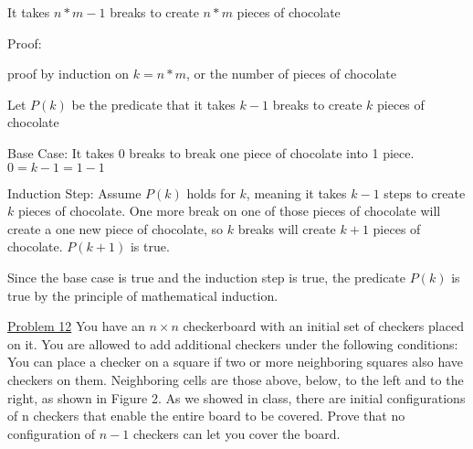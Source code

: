 \documentclass[12pt]{article}[12pt]
\begin{document}
\begin{addmargin}[1em]{2em}

It takes $n*m-1$ breaks to create $n*m$ pieces of chocolate

Proof: 

proof by induction on $k=n*m$, or the number of pieces of chocolate

Let $P(k)$ be the predicate that it takes $k-1$ breaks to create $k$ pieces of chocolate

Base Case: It takes 0 breaks to break one piece of chocolate into 1 piece. $0=k-1=1-1$

Induction Step: Assume $P(k)$ holds for $k$, meaning it takes $k-1$ steps to create $k$ pieces of chocolate. One more break on one of those pieces of chocolate will create a one new piece of chocolate, so $k$ breaks will create $k+1$ pieces of chocolate. $P(k+1)$ is true.

Since the base case is true and the induction step is true, the predicate $P(k)$ is true by the principle of mathematical induction.
\end{addmargin}
\bigskip
\underline{Problem 12}
You have an $n×n$ checkerboard with an initial set of checkers placed on it. You are allowed to add additional checkers under the following conditions: You can place a checker on a square if two or more neighboring squares also have checkers on them. Neighboring cells are those above, below, to the left and to the right, as shown in Figure 2. As we showed in class, there are initial configurations of n checkers that enable the entire board to be covered. Prove that no configuration of $n − 1$ checkers can let you cover the board.
\end{document}
